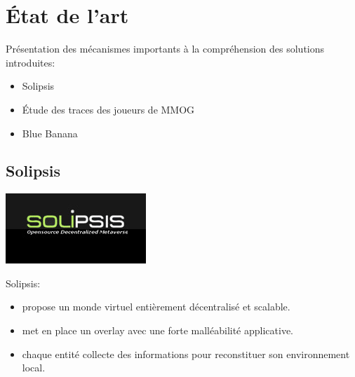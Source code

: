 \documentclass{beamer}
\begin{document}
  \section{État de l'art}
  \begin{frame}
	Présentation des  mécanismes importants à la compréhension des solutions introduites:\\
	\begin{itemize}
		\item Solipsis\\
		\item Étude des traces des joueurs de MMOG\\
		\item Blue Banana \\
	\end{itemize}
  \end{frame}

  \subsection{Solipsis}

  \begin{frame}
	\begin{center}
	\includegraphics[scale=0.35]{./Ressources/Images/solipsis.png}\\
	\end{center}
	\vspace{4mm}
	Solipsis:\\
	\begin{itemize}
		\item propose un monde virtuel entièrement décentralisé et scalable.\\
		\item met en place un overlay avec une forte malléabilité applicative.\\
		\item chaque entité collecte des informations pour reconstituer son environnement local.\\
	\end{itemize}
  \end{frame}
\end{document}
